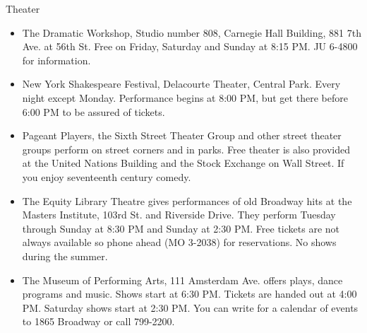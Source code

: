 \documentclass[11pt,twoside,a4paper]{book}
\begin{document}
Theater 
\begin{itemize}
\item The Dramatic Workshop, Studio number 808, Carnegie Hall Building, 881 7th Ave. at 56th St. Free on Friday, Saturday and Sunday at 8:15 PM. JU 6-4800 for information.
\item New York Shakespeare Festival, Delacourte Theater, Central Park. Every night except Monday. Performance begins at 8:00 PM, but get there before 6:00 PM to be assured of tickets. 
\item Pageant Players, the Sixth Street Theater Group and other street theater groups perform on street corners and in parks. Free theater is also provided at the United Nations Building and the Stock Exchange on Wall Street. If you enjoy seventeenth century comedy. 
\item The Equity Library Theatre gives performances of old Broadway hits at the Masters Institute, 103rd St. and Riverside Drive. They perform Tuesday through Sunday at 8:30 PM and Sunday at 2:30 PM. Free tickets are not always available so phone ahead (MO 3-2038) for reservations. No shows during the summer. 
\item The Museum of Performing Arts, 111 Amsterdam Ave. offers plays, dance programs and music. Shows start at 6:30 PM. Tickets are handed out at 4:00 PM. Saturday shows start at 2:30 PM. You can write for a calendar of events to 1865 Broadway or call 799-2200.
\end{itemize}
\end{document}
